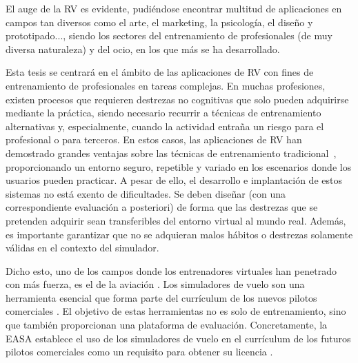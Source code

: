 
El auge de la \ac{RV} es evidente, pudiéndose encontrar multitud de aplicaciones en campos tan diversos como el arte, el marketing, la psicología, el diseño y prototipado..., siendo los sectores del entrenamiento de profesionales (de muy diversa naturaleza) y del ocio, en los que más se ha desarrollado.

Esta tesis se centrará en el ámbito de las aplicaciones de \ac{RV} con fines de entrenamiento de profesionales en tareas complejas. En muchas profesiones, existen procesos que requieren destrezas no cognitivas que solo pueden adquirirse mediante la práctica, siendo necesario recurrir a técnicas de entrenamiento alternativas y, especialmente, cuando la actividad entraña un riesgo para el profesional o para terceros. En estos casos, las aplicaciones de \ac{RV} han demostrado  grandes ventajas sobre las técnicas de entrenamiento tradicional~\cite{PATEL2017266.e7}, proporcionando un entorno seguro, repetible y variado en los escenarios donde los usuarios pueden practicar. A pesar de ello, el desarrollo e implantación de estos sistemas no está exento de dificultades. Se deben diseñar (con una correspondiente evaluación a posteriori) de forma que las destrezas que se pretenden adquirir sean transferibles del entorno virtual al mundo real. Además, es importante garantizar que no se adquieran malos hábitos o destrezas solamente válidas en el contexto del simulador.

Dicho esto, uno de los campos donde los entrenadores virtuales han penetrado con más fuerza, es el de la aviación \cite{lee2017flight}. Los simuladores de vuelo son una herramienta esencial que forma parte del currículum de los nuevos pilotos comerciales \cite{piloto}. El objetivo de estas herramientas no es solo de entrenamiento, sino que también proporcionan una plataforma de evaluación.  %
Concretamente, la \ac{EASA} establece el uso de los simuladores de vuelo en el currículum de los futuros pilotos comerciales como un requisito para obtener su licencia \cite{normativa}.

